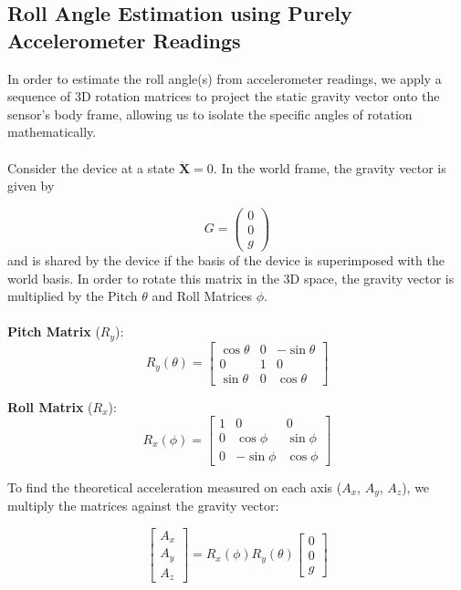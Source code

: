 \documentclass{article}
\begin{document}
\subsection{Roll Angle Estimation using Purely Accelerometer Readings}
In order to estimate the roll angle(s) from accelerometer readings, we apply a sequence of 3D rotation matrices to project the static gravity vector onto the sensor's body frame, allowing us to isolate the specific angles of rotation mathematically.\\
\\
Consider the device at a state $\ddot{\mathbf{X}} = 0$. In the world frame, the gravity vector is given by

\begin{equation}
    G = \begin{pmatrix}
        0 \\
        0 \\
        g
    \end{pmatrix}
\end{equation}
and is shared by the device if the basis of the device is superimposed with the world basis. In order to rotate this matrix in the 3D space, the gravity vector is multiplied by the Pitch $\theta$ and Roll Matrices $\phi$.\\
\\

\textbf{Pitch Matrix} ($R_y$):
\begin{equation}
R_y(\theta) = 
\begin{bmatrix} 
\cos\theta & 0 & -\sin\theta \\ 
0 & 1 & 0 \\ 
\sin\theta & 0 & \cos\theta 
\end{bmatrix}
\end{equation}

\textbf{Roll Matrix} ($R_x$):
\begin{equation}
R_x(\phi) = 
\begin{bmatrix} 
1 & 0 & 0 \\ 
0 & \cos\phi & \sin\phi \\ 
0 & -\sin\phi & \cos\phi 
\end{bmatrix}
\end{equation}

To find the theoretical acceleration measured on each axis ($A_x$, $A_y$, $A_z$), we multiply the matrices against the gravity vector:

\begin{equation}
\begin{bmatrix} 
A_x \\ 
A_y \\ 
A_z 
\end{bmatrix} 
= R_x(\phi) R_y(\theta) 
\begin{bmatrix} 
0 \\ 
0 \\ 
g 
\end{bmatrix}
\end{equation}
\end{document}
